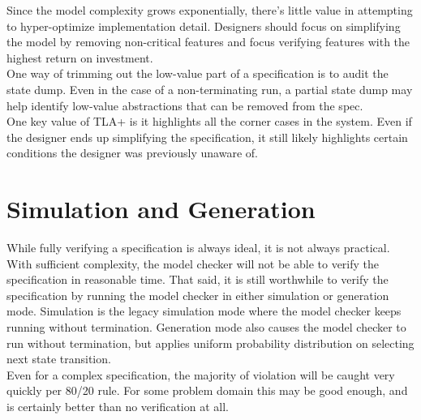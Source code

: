 Since the model complexity grows exponentially, there's little value in
attempting to hyper-optimize implementation detail. Designers should focus on
simplifying the model by removing non-critical features and focus verifying
features with the highest return on investment.\\

One way of trimming out the low-value part of a specification is to audit the
state dump. Even in the case of a non-terminating run, a partial state dump may
help identify low-value abstractions that can be removed from the spec.\\

One key value of TLA+ is it highlights all the corner cases in the system. Even
if the designer ends up simplifying the specification, it still likely highlights certain
conditions the designer was previously unaware of.\\


\section{Simulation and Generation}

While fully verifying a specification is always ideal, it is not always
practical. With sufficient complexity, the model checker will not be able to 
verify the specification in reasonable time. That said, it is still worthwhile 
to verify the specification by running the model checker in either simulation or
generation mode. Simulation is the legacy simulation mode where the model
checker keeps running without termination. Generation mode also causes the model
checker to run without termination, but applies uniform probability distribution
on selecting next state transition.\\

Even for a complex specification, the majority of violation will be caught very
quickly per 80/20 rule. For some problem domain this may be good enough, and is
certainly better than no verification at all. 